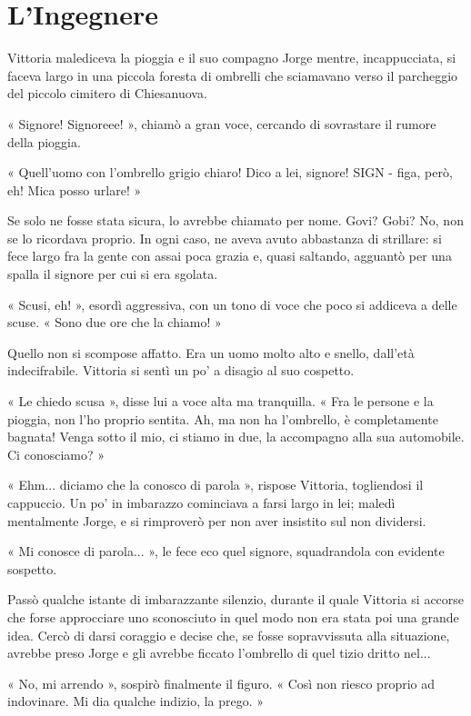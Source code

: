 \chapter{L'Ingegnere}


Vittoria malediceva la pioggia e il suo compagno Jorge mentre, incappucciata, si faceva largo in una piccola foresta di ombrelli che sciamavano verso il parcheggio del piccolo cimitero di Chiesanuova.

« Signore! Signoreee! », chiamò a gran voce, cercando di sovrastare il rumore della pioggia.

« Quell'uomo con l'ombrello grigio chiaro! Dico a lei, signore! SIGN - figa, però, eh! Mica posso urlare! »

Se solo ne fosse stata sicura, lo avrebbe chiamato per nome. Govi? Gobi? No, non se lo ricordava proprio. In ogni caso, ne aveva avuto abbastanza di strillare: si fece largo fra la gente con assai poca grazia e, quasi saltando, agguantò per una spalla il signore per cui si era sgolata.

« Scusi, eh! », esordì aggressiva, con un tono di voce che poco si addiceva a delle scuse. « Sono due ore che la chiamo! »

Quello non si scompose affatto. Era un uomo molto alto e snello, dall'età indecifrabile. Vittoria si sentì un po' a disagio al suo cospetto.

« Le chiedo scusa », disse lui a voce alta ma tranquilla. « Fra le persone e la pioggia, non l'ho proprio sentita. Ah, ma non ha l'ombrello, è completamente bagnata! Venga sotto il mio, ci stiamo in due, la accompagno alla sua automobile. Ci conosciamo? »

« Ehm... diciamo che la conosco di parola », rispose Vittoria, togliendosi il cappuccio. Un po' in imbarazzo cominciava a farsi largo in lei; maledì mentalmente Jorge, e si rimproverò per non aver insistito sul non dividersi.

« Mi conosce di parola... », le fece eco quel signore, squadrandola con evidente sospetto.

Passò qualche istante di imbarazzante silenzio, durante il quale Vittoria si accorse che forse approcciare uno sconosciuto in quel modo non era stata poi una grande idea. Cercò di darsi coraggio e decise che, se fosse sopravvissuta alla situazione, avrebbe preso Jorge e gli avrebbe ficcato l'ombrello di quel tizio dritto nel...

« No, mi arrendo », sospirò finalmente il figuro. « Così non riesco proprio ad indovinare. Mi dia qualche indizio, la prego. »

